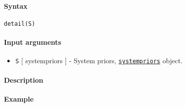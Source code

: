 


	\paragraph{Syntax}\label{syntax}

\begin{verbatim}
detail(S)
\end{verbatim}

\paragraph{Input arguments}\label{input-arguments}

\begin{itemize}
\itemsep1pt\parskip0pt
\item
  \texttt{S} {[} systempriors {]} - System priors,
  \href{systempriors/Contents}{\texttt{systempriors}} object.
\end{itemize}

\paragraph{Description}\label{description}

\paragraph{Example}\label{example}


